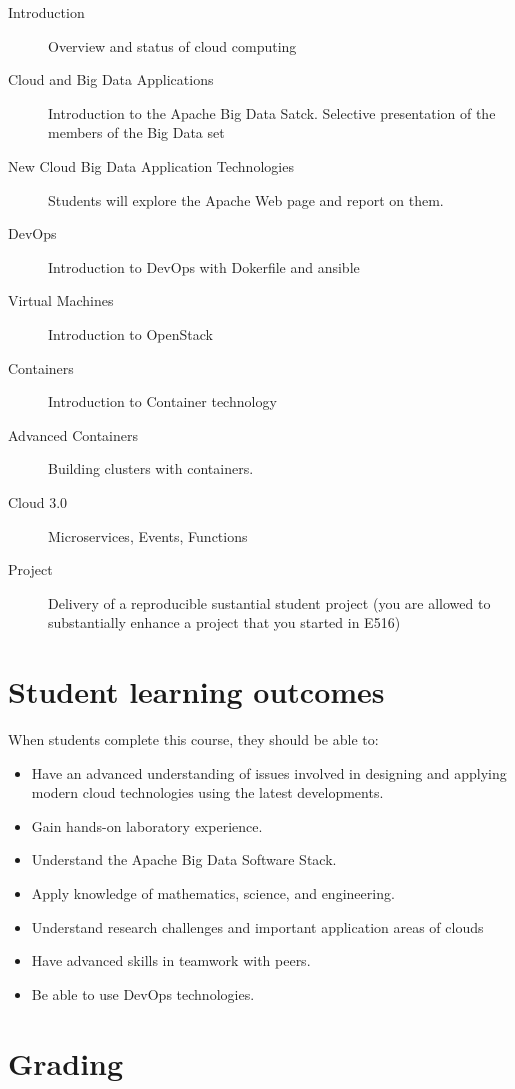 \begin{description}

\item[Introduction] Overview and status of cloud computing
\item[Cloud and Big Data Applications] Introduction to the Apache Big
  Data Satck. Selective presentation of the members of the Big Data
  set
\item[New Cloud Big Data Application Technologies] Students will
  explore the Apache Web page and report on them.
\item[DevOps] Introduction to DevOps with Dokerfile and ansible
\item[Virtual Machines] Introduction to OpenStack
\item[Containers] Introduction to Container technology
\item[Advanced Containers] Building clusters with containers.
\item[Cloud 3.0] Microservices, Events, Functions  
\item[Project] Delivery of a reproducible sustantial student project
  (you are allowed to substantially enhance a project that you started
  in E516)

\end{description}

\section{Student learning outcomes}

When students complete this course, they should be able to:

\begin{itemize}
\item Have an advanced understanding of issues involved in designing
  and applying modern cloud technologies using the latest
  developments.
\item	Gain hands-on laboratory experience.
\item	Understand the Apache Big Data Software Stack.
\item	Apply knowledge of mathematics, science, and engineering.
\item Understand research challenges and important application areas
  of clouds
\item	Have advanced skills in teamwork with peers.
\item Be able to use DevOps technologies.
\end{itemize}

\section{Grading}


